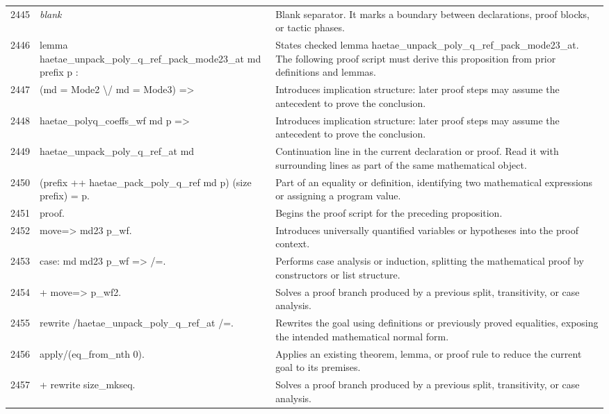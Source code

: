 \documentclass[10pt]{article}
\begin{document}
\begin{longtable}{r L{0.53\textwidth} L{0.37\textwidth}}
2445 & {\ttfamily\scriptsize \emph{blank}} & Blank separator.  It marks a boundary between declarations, proof blocks, or tactic phases. \\
2446 & {\ttfamily\scriptsize lemma haetae\_unpack\_poly\_q\_ref\_pack\_mode23\_at md prefix p :} & States checked lemma haetae\_unpack\_poly\_q\_ref\_pack\_mode23\_at.  The following proof script must derive this proposition from prior definitions and lemmas. \\
2447 & {\ttfamily\scriptsize   (md = Mode2 \textbackslash{}/ md = Mode3) =>} & Introduces implication structure: later proof steps may assume the antecedent to prove the conclusion. \\
2448 & {\ttfamily\scriptsize   haetae\_polyq\_coeffs\_wf md p =>} & Introduces implication structure: later proof steps may assume the antecedent to prove the conclusion. \\
2449 & {\ttfamily\scriptsize   haetae\_unpack\_poly\_q\_ref\_at md} & Continuation line in the current declaration or proof.  Read it with surrounding lines as part of the same mathematical object. \\
2450 & {\ttfamily\scriptsize     (prefix ++ haetae\_pack\_poly\_q\_ref md p) (size prefix) = p.} & Part of an equality or definition, identifying two mathematical expressions or assigning a program value. \\
2451 & {\ttfamily\scriptsize proof.} & Begins the proof script for the preceding proposition. \\
2452 & {\ttfamily\scriptsize move=> md23 p\_wf.} & Introduces universally quantified variables or hypotheses into the proof context. \\
2453 & {\ttfamily\scriptsize case: md md23 p\_wf => /=.} & Performs case analysis or induction, splitting the mathematical proof by constructors or list structure. \\
2454 & {\ttfamily\scriptsize + move=> p\_wf2.} & Solves a proof branch produced by a previous split, transitivity, or case analysis. \\
2455 & {\ttfamily\scriptsize   rewrite /haetae\_unpack\_poly\_q\_ref\_at /=.} & Rewrites the goal using definitions or previously proved equalities, exposing the intended mathematical normal form. \\
2456 & {\ttfamily\scriptsize   apply/(eq\_from\_nth 0).} & Applies an existing theorem, lemma, or proof rule to reduce the current goal to its premises. \\
2457 & {\ttfamily\scriptsize   + rewrite size\_mkseq.} & Solves a proof branch produced by a previous split, transitivity, or case analysis. \\

\end{longtable}
\end{document}

